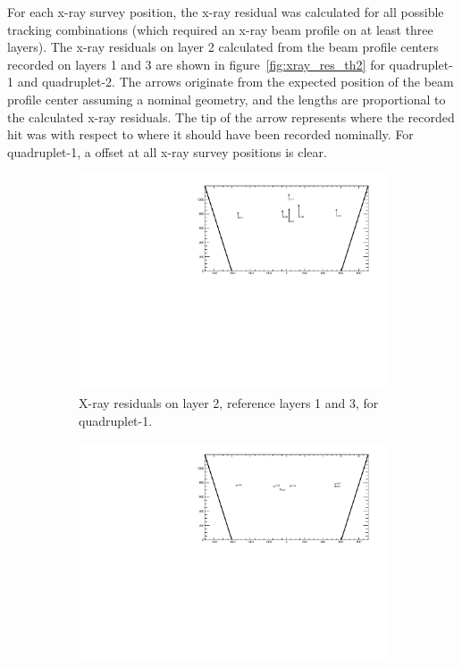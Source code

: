 For each x-ray survey position, the x-ray residual was calculated for all possible tracking combinations (which required an x-ray beam profile on at least three layers). The x-ray residuals on layer 2 calculated from the beam profile centers recorded on layers 1 and 3 are shown in figure~\ref{fig:xray_res_th2} for quadruplet-1 and quadruplet-2. The arrows originate from the expected position of the beam profile center assuming a nominal geometry, and the lengths are proportional to the calculated x-ray residuals. The tip of the arrow represents where the recorded hit was with respect to where it should have been recorded nominally. For quadruplet-1, a offset at all x-ray survey positions is clear. 

\newpage
\thispagestyle{empty}
\begin{figure}
\centering
\begin{subfigure}{\textwidth}
  \centering
  \includegraphics[width=\linewidth]{figures/QL2P11_xray_residuals_layer2_fixedlayers13.pdf}
  \caption{X-ray residuals on layer 2, reference layers 1 and 3, for quadruplet-1.}
  \label{fig:xray_res_th2_ql2p11}
\end{subfigure}%
\vspace*{\floatsep}
\begin{subfigure}{\textwidth}
  \centering
  \includegraphics[width=\linewidth]{figures/QL2P08_xray_residuals_layer2_fixedlayers13.pdf}

\end{subfigure}
\end{figure}

